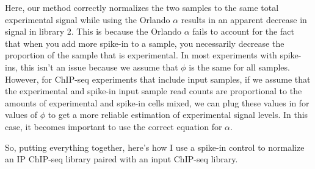 Here, our method correctly normalizes the two samples to the same total experimental signal while using the Orlando $\alpha$ results in an apparent decrease in signal in library 2.
This is because the Orlando $\alpha$ fails to account for the fact that when you add more spike-in to a sample, you necessarily decrease the proportion of the sample that is experimental.
In most experiments with spike-ins, this isn't an issue because we assume that $\phi$ is the same for all samples.
However, for ChIP-seq experiments that include input samples, if we assume that the experimental and spike-in input sample read counts are proportional to the amounts of experimental and spike-in cells mixed, we can plug these values in for values of $\phi$ to get a more reliable estimation of experimental signal levels.
In this case, it becomes important to use the correct equation for $\alpha$.

So, putting everything together, here's how I use a spike-in control to normalize an IP ChIP-seq library paired with an input ChIP-seq library.

